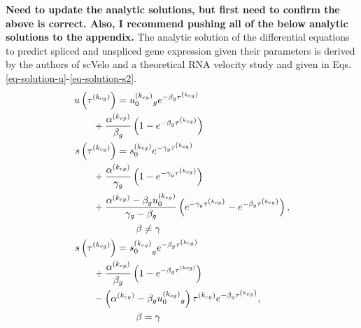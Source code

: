 \documentclass[
  sn-mathphys-num,
  lineno,
  twocolumn]{sn-jnl}
\begin{document}
\textbf{Need to update the analytic solutions, but first need to confirm the above is correct. Also, I recommend pushing all of the below analytic solutions to the appendix.}
The analytic solution of the differential equations to predict spliced
and unspliced gene expression given their parameters is derived by the
authors of scVelo and a theoretical RNA velocity study
\citep{Bergen2020-pj, Li2021-qa} and given in Eqs.
\ref{eq-solution-u}-\ref{eq-solution-s2}. \begin{align}
u\left(\tau^{\left(k_{c g}\right)}\right) 
  &= u_0^{\left(k_{c g}\right)}{ }_g e^{-\beta_g \tau^{\left(k_{c g}\right)}} 
  \nonumber \\
&\hskip -24pt + \frac{\alpha^{\left(k_{c g}\right)}}
  {\beta_g}\left(1-e^{-\beta_g \tau^{\left(k_{c g}\right)}}\right) 
  \label{eq-solution-u}\\
s\left(\tau^{\left(k_{c g}\right)}\right) 
  &= s_0^{\left(k_{c g}\right)} e^{-\gamma_g \tau^{\left(k_{c g}\right)}} 
  \nonumber \\
  &\hskip -24pt + \frac{\alpha^{\left(k_{c g}\right)}}{\gamma_g}
    \left(1-e^{-\gamma_g \tau^{\left(k_{c g}\right)}}\right) 
    \nonumber\\
  &\hskip -24pt + \frac{\alpha^{\left(k_{c g}\right)}-\beta_g u_0^{\left(k_{c g}\right)}}
    {\gamma_g-\beta_g}\left(e^{-\gamma_g \tau^{\left(k_{c g}\right)}}
    -e^{-\beta_g \tau^{\left(k_{c g}\right)}}\right), 
    \nonumber \\
  &\qquad \beta \neq \gamma \label{eq-solution-s} \\
s\left(\tau^{\left(k_{c g}\right)}\right) 
  &= {s_0^{\left(k_{c g}\right)}}_g e^{-\beta_g \tau^{\left(k_{c g}\right)}} \nonumber \\
  &\hskip -24pt +\frac{\alpha^{\left(k_{c g}\right)}}{\beta_g}
  \left(1-e^{-\beta_g \tau^{(k c g)}}\right) 
  \nonumber \\
  &\hskip -24pt -\left(\alpha^{\left(k_{c g}\right)}
  -\beta_g u_0^{\left(k_{c g}\right)}{ }_g\right) \tau^{\left(k_{c g}\right)} 
  e^{-\beta_g \tau^{\left(k_{c g}\right)}}, \nonumber \\
  &\qquad \beta = \gamma \label{eq-solution-s2}
\end{align}
\end{document}
